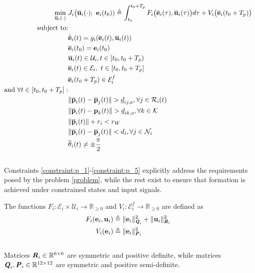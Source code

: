 \begin{align}
  \min\limits_{\overline{\bm{\mathbf{u}}}_i (\cdot)}\ &
    J_i \big(\overline{\bm{\mathbf{u}}}_i (\cdot);\ \bm{\mathbf{e}}_i(t_0)) \triangleq
      \int_{t_0}^{t_0 + T_p} F_i \big(\overline{\bm{\mathbf{e}}}_i(\tau), \overline{\bm{\mathbf{u}}}_i (\tau)\big) d \tau +
      V_i \big(\overline{\bm{\mathbf{e}}}_i (t_0 + T_p)\big) \\
  \text{subject to:} & \\
  & \dot{\overline{\bm{\mathbf{e}}}}_i(t) = g_i (\overline{\bm{\mathbf{e}}}_i (t), \overline{\bm{\mathbf{u}}}_i (t)) \\
  & \overline{\bm{\mathbf{e}}}_i (t_0) = \bm{\mathbf{e}}_i (t_0) \\
  & \overline{\bm{\mathbf{u}}}_i(t) \in \mathcal{U}_i, t \in [t_0, t_0 + T_p)\\
  & \overline{\bm{\mathbf{e}}}_i (t) \in \mathcal{E}_i,\ t \in [t_0, t_0 + T_p]\\
  & \overline{\bm{\mathbf{e}}}_i (t_0 + T_p) \in \mathcal{E}_i^f \\
  \text{and } \forall t \in [t_0, t_0 + T_p]:& \nonumber \\
  & \|\overline{\bm{\mathbf{p}}}_i(t) - \overline{\bm{\mathbf{p}}}_j(t)\| > \underline{d}_{ij,a}, \forall j \in \mathcal{R}_i(t) \label{constraint:p_1}\\
  & \|\overline{\bm{\mathbf{p}}}_i(t) - \bm{\mathbf{p}}_k(t)\| > \underline{d}_{ik,o}, \forall k \in \mathcal{K} \\
  & \|\overline{\bm{\mathbf{p}}}_i(t)\| + r_i < r_W \\
  & \|\overline{\bm{\mathbf{p}}}_i(t) - \overline{\bm{\mathbf{p}}}_j(t)\| < d_i, \forall j \in \mathcal{N}_i \\
  & \overline{\theta}_i(t) \ne \pm \frac{\pi}{2} \label{constraint:p_5}
\end{align}\\
Constraints \ref{constraint:p_1}-\ref{constraint:p_5} explicitly address the
requirements posed by the problem \eqref{problem}, while the rest exist to
ensure that formation is achieved under constrained states and input signals.

The functions
$F_i : \mathcal{E}_i \times \mathcal{U}_i \to \mathbb{R}_{\geq 0}$ and
$V_i: \mathcal{E}_i^f \to \mathbb{R}_{\geq 0}$ are defined as
\begin{align}
  F_i (\bm{\mathbf{e}}_i, \bm{\mathbf{u}}_i)
    &\triangleq \| \bm{\mathbf{e}}_i\|_{\bm{\mathit{Q}}_i}^2 + \| \bm{\mathbf{u}}_i\|_{\bm{\mathit{R}}_i}^2 \\
  V_i (\bm{\mathbf{e}}_i)
    & \triangleq \| \bm{\mathbf{e}}_i \|_{\bm{\mathit{P}}_i}^2
\end{align}\\
Matrices $\bm{\mathit{R}}_i \in \mathbb{R}^{6 \times 6}$ are symmetric and positive
definite, while matrices $\bm{\mathit{Q}}_i, \bm{\mathit{P}}_i \in \mathbb{R}^{12 \times 12}$
are symmetric and positive semi-definite.

